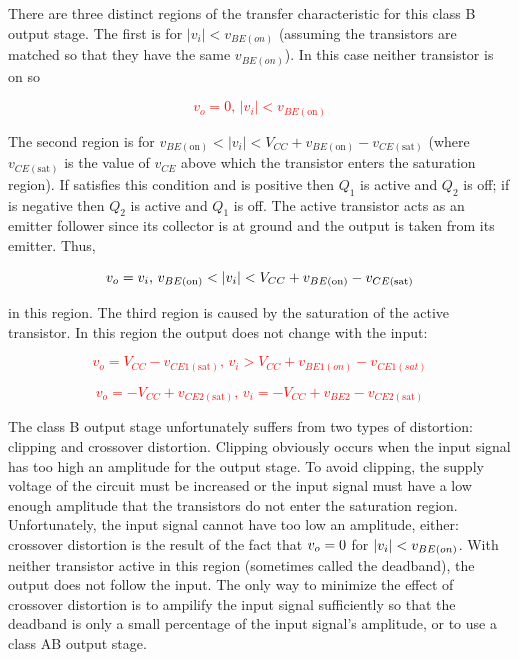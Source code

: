There are three distinct regions of the transfer characteristic for this class B output stage.
The first is for $|v_{i}| < v_{BE(on)}$ (assuming the transistors are matched so that they have the same $v_{BE(on)}$).
In this case neither transistor is on so

\textcolor{red}{
\begin{equation}
v_{o} = 0\text{, }|v_{i}| < v_{BE(\text{on})}
\end{equation}
}

The second region is for $v_{BE(\text{on})} < |v_{i}| < V_{CC} + v_{BE(\text{on})} - v_{CE(\text{sat})}$ (where $v_{CE(\text{sat})}$ is the value of $v_{CE}$ above which the transistor enters the saturation region).
If \vin satisfies this condition and is positive then $Q_1$ is active and $Q_2$ is off;
if \vin is negative then $Q_2$ is active and $Q_1$ is off.
The active transistor acts as an emitter follower since its collector is at \AC ground and the output is taken from its emitter.
Thus,

\textcolor{red}{
\begin{equation}
v_o = v_i\text{, }v_{BE(\text{on})} < |v_i| < V_{CC} + v_{BE(\text{on})}-v_{CE(\text{sat})}
\end{equation}
}

in this region.
The third region is caused by the saturation of the active transistor. In this region the output does not change with the input:

\textcolor{red}{
\begin{equation}
v_{o} = V_{CC}-v_{CE1(\text{sat})}\text{, }v_{i} > V_{CC} + v_{BE1(on)} - v_{CE1(sat)}
\end{equation}
}

\textcolor{red}{
\begin{equation}
v_{o} = -V_{CC}+v_{CE2(\text{sat})}\text{, }v_{i} = -V_{CC}+v_{BE2}-v_{CE2(\text{sat})}
\end{equation}
}

The class B output stage unfortunately suffers from two types of distortion:
clipping and crossover distortion.
Clipping obviously occurs when the input signal has too high an amplitude for the output stage.
To avoid clipping, the supply voltage of the circuit must be increased or the input signal must have a low enough amplitude that the transistors do not enter the saturation region.
Unfortunately, the input signal cannot have too low an amplitude, either:
crossover distortion is the result of the fact that $v_o = 0$ for $|v_i| < v_{BE(on)}$.
With neither transistor active in this region (sometimes called the deadband), the output does not follow the input.
The only way to minimize the effect of crossover distortion is to ampilify the input signal sufficiently so that the deadband is only a small percentage of the input signal's amplitude, or to use a class AB output stage. \autocite[362-364]{analysis-design-analog-ics}

